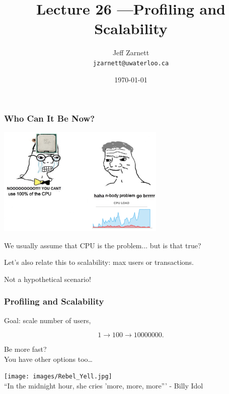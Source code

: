 

\title{Lecture 26 ---Profiling and Scalability}

\author{Jeff Zarnett\\ \small \texttt{jzarnett@uwaterloo.ca}}
\date{\today}




\begin{frame}
  \titlepage

 \end{frame}


\begin{frame}
\frametitle{Who Can It Be Now?}

\begin{center}
	\includegraphics[width=0.6\textwidth]{images/n-body-go-brrrrr.png}
\end{center}

We usually assume that CPU is the problem... but is that true?

Let's also relate this to scalability: max users or transactions.

Not a hypothetical scenario!

\end{frame}



\begin{frame}
\frametitle{Profiling and Scalability}


Goal: scale number of users,

\[ 1 \rightarrow 100 \rightarrow 10 000 000. \]

Be more fast? \\
You have other options too\ldots


\begin{center}
	\texttt{[image: images/Rebel\_Yell.jpg]}\\
	\hfill ``In the midnight hour, she cries 'more, more, more''' - Billy Idol
\end{center}

\end{frame}


